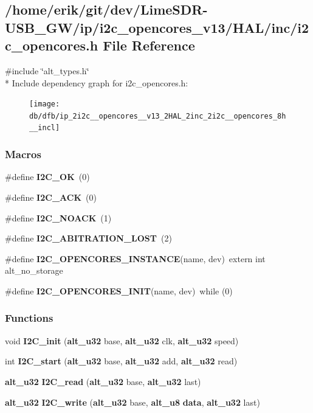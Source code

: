 \subsection{/home/erik/git/dev/\+Lime\+S\+D\+R-\/\+U\+S\+B\+\_\+\+G\+W/ip/i2c\+\_\+opencores\+\_\+v13/\+H\+A\+L/inc/i2c\+\_\+opencores.h File Reference}
\label{ip_2i2c__opencores__v13_2HAL_2inc_2i2c__opencores_8h}
{\ttfamily \#include \char`\"{}alt\+\_\+types.\+h\char`\"{}}\\*
Include dependency graph for i2c\+\_\+opencores.\+h\+:
\nopagebreak
\begin{figure}[H]
\begin{center}
\leavevmode
\texttt{[image: db/dfb/ip\_2i2c\_\_opencores\_\_v13\_2HAL\_2inc\_2i2c\_\_opencores\_8h\_\_incl]}
\end{center}
\end{figure}
\subsubsection*{Macros}
\begin{DoxyCompactItemize}
\item 
\#define {\bf I2\+C\+\_\+\+OK}~(0)
\item 
\#define {\bf I2\+C\+\_\+\+A\+CK}~(0)
\item 
\#define {\bf I2\+C\+\_\+\+N\+O\+A\+CK}~(1)
\item 
\#define {\bf I2\+C\+\_\+\+A\+B\+I\+T\+R\+A\+T\+I\+O\+N\+\_\+\+L\+O\+ST}~(2)
\item 
\#define {\bf I2\+C\+\_\+\+O\+P\+E\+N\+C\+O\+R\+E\+S\+\_\+\+I\+N\+S\+T\+A\+N\+CE}(name,  dev)~extern int alt\+\_\+no\+\_\+storage
\item 
\#define {\bf I2\+C\+\_\+\+O\+P\+E\+N\+C\+O\+R\+E\+S\+\_\+\+I\+N\+IT}(name,  dev)~while (0)
\end{DoxyCompactItemize}
\subsubsection*{Functions}
\begin{DoxyCompactItemize}
\item 
void {\bf I2\+C\+\_\+init} ({\bf alt\+\_\+u32} base, {\bf alt\+\_\+u32} clk, {\bf alt\+\_\+u32} speed)
\item 
int {\bf I2\+C\+\_\+start} ({\bf alt\+\_\+u32} base, {\bf alt\+\_\+u32} add, {\bf alt\+\_\+u32} read)
\item 
{\bf alt\+\_\+u32} {\bf I2\+C\+\_\+read} ({\bf alt\+\_\+u32} base, {\bf alt\+\_\+u32} last)
\item 
{\bf alt\+\_\+u32} {\bf I2\+C\+\_\+write} ({\bf alt\+\_\+u32} base, {\bf alt\+\_\+u8} {\bf data}, {\bf alt\+\_\+u32} last)
\end{DoxyCompactItemize}


